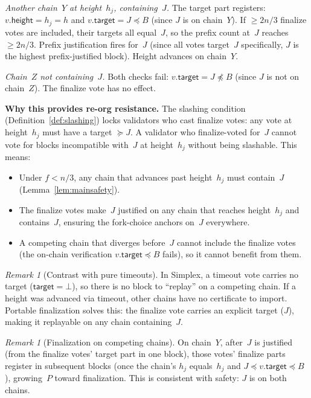 \ifx\litemode\undefined\documentclass{article}\fi
\renewcommand{\paragraph}[1]{\vspace{7pt}\noindent\textbf{#1}}
\newcommand{\target}{\mathsf{target}}
\newcommand{\height}{\mathsf{height}}
\theoremstyle{plain}
\theoremstyle{definition}
\theoremstyle{remark}
\newtheorem{remark}[theorem]{Remark}
\begin{document}
\emph{Another chain~$Y$ at height~$h_j$, containing~$J$.}
The target part registers: $v.\height = h_j = h$ and $v.\target = J \preceq B$ (since $J$ is on chain~$Y$).
If $\geq 2n/3$ finalize votes are included, their targets all equal~$J$, so the prefix count at~$J$ reaches $\geq 2n/3$.
Prefix justification fires for~$J$ (since all votes target~$J$ specifically, $J$ is the highest prefix-justified block).
Height advances on chain~$Y$.

\emph{Chain~$Z$ not containing~$J$.}
Both checks fail: $v.\target = J \not\preceq B$ (since $J$ is not on chain~$Z$).
The finalize vote has no effect.

\paragraph{Why this provides re-org resistance.}
The slashing condition (Definition~\ref{def:slashing}) locks validators who cast finalize votes: any vote at height~$h_j$ must have a target $\succeq J$.
A validator who finalize-voted for~$J$ cannot vote for blocks incompatible with~$J$ at height~$h_j$ without being slashable.
This means:
\begin{itemize}
  \item Under $f < n/3$, any chain that advances past height~$h_j$ must contain~$J$ (Lemma~\ref{lem:mainsafety}).
  \item The finalize votes make~$J$ justified on any chain that reaches height~$h_j$ and contains~$J$, ensuring the fork-choice anchors on~$J$ everywhere.
  \item A competing chain that diverges before~$J$ cannot include the finalize votes (the on-chain verification $v.\target \preceq B$ fails), so it cannot benefit from them.
\end{itemize}

\begin{remark}[Contrast with pure timeouts]
In Simplex, a timeout vote carries no target ($\target = \bot$), so there is no block to ``replay'' on a competing chain.
If a height was advanced via timeout, other chains have no certificate to import.
Portable finalization solves this: the finalize vote carries an explicit target ($J$), making it replayable on any chain containing~$J$.
\end{remark}

\begin{remark}[Finalization on competing chains]
On chain~$Y$, after~$J$ is justified (from the finalize votes' target part in one block), those votes' finalize parts register in subsequent blocks (once the chain's $h_j$ equals~$h_j$ and $J \preceq v.\target \preceq B$), growing~$P$ toward finalization.
This is consistent with safety: $J$ is on both chains.
\end{remark}
\end{document}
